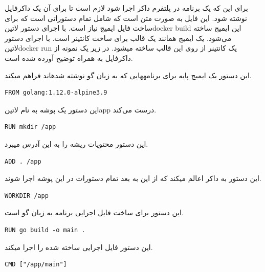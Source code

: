 \documentclass[a4]{report}
\begin{document}
برای این که یک برنامه در پلتفرم داکر اجرا شود لازم است تا برای آن یک داکرفایل
نوشته شود. این فایل به صورت متن است که شامل تمام دستوراتی است که برای ساخت فایل ایمیج نیاز است. با اجرای دستور ‌لاتین{docker build} این ایمیج ساخته می‌شود. یک ایمیج همانند یک قالب برای ساخت کانتینر است. با اجرای دستور ‌لاتین{docker run} یک کانتینر از روی این قالب ساخته میشود.
 در زیر یک نمونه از داکرفایل به همراه توضیح آورده شده است.


این دستور یک ایمیج پایه برای برنامههایی که به زبان گو نوشته شدهاند فراهم میکند.

\begin{latin}
\begin{verbatim}
FROM golang:1.12.0-alpine3.9
\end{verbatim}
\end{latin}

این دستور یک پوشه به نام ‌لاتین{app} درست می‌کند.

\begin{latin}
\begin{verbatim}
RUN mkdir /app
\end{verbatim}
\end{latin}

این دستور محتویات ریشه را به این آدرس میبرد.

\begin{latin}
\begin{verbatim}
ADD . /app
\end{verbatim}
\end{latin}

این دستور به داکر اعالم میکند که از این به بعد تمام دستورات در این پوشه اجرا شوند.

\begin{latin}
\begin{verbatim}
WORKDIR /app
\end{verbatim}
\end{latin}

این دستور برای ساخت فایل اجرایی برنامه به زبان گو است.

\begin{latin}
\begin{verbatim}
RUN go build -o main .
\end{verbatim}
\end{latin}

این دستور فایل اجرایی ساخته شده را اجرا میکند.

\begin{latin}
\begin{verbatim}
CMD ["/app/main"]
\end{verbatim}
\end{latin}
\end{document}
